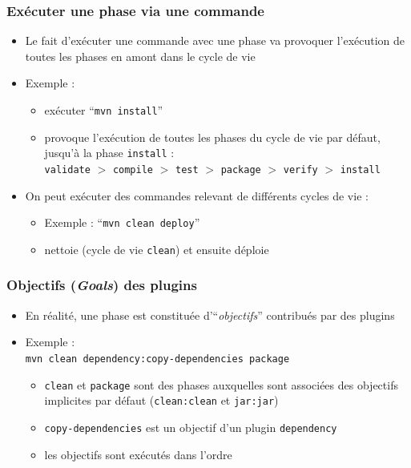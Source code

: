 \documentclass{beamer}
\begin{document}
\begin{frame}[fragile]
  \frametitle{Exécuter une phase via une commande}
\begin{itemize}
\item Le fait d'exécuter une commande avec une phase va provoquer
  l'exécution de toutes les phases en amont dans le cycle de vie
\item Exemple :
  \begin{itemize}
  \item exécuter ``\texttt{mvn install}''
  \item provoque l'exécution de toutes les phases du cycle de vie par
    défaut, jusqu'à la phase \texttt{install} :\\ \texttt{validate} $>$
    \texttt{compile} $>$ \texttt{test} $>$ \texttt{package} $>$ \texttt{verify}
    $>$ \texttt{install}
  \end{itemize}
\item On peut exécuter des commandes relevant de différents cycles de vie :
  \begin{itemize}
  \item Exemple : ``\texttt{mvn clean deploy}''
  \item nettoie (cycle de vie \texttt{clean}) et ensuite déploie
  \end{itemize}
\end{itemize}
\end{frame}

\begin{frame}[fragile]
  \frametitle{Objectifs (\textit{Goals}) des plugins}
\begin{itemize}
\item En réalité, une phase est constituée d'``\textit{objectifs}''
  contribués par des plugins
\item Exemple :\\ \texttt{mvn clean dependency:copy-dependencies package}
  \begin{itemize}
  \item \texttt{clean} et \texttt{package} sont des phases auxquelles
    sont associées des objectifs implicites par défaut
    (\texttt{clean:clean} et \texttt{jar:jar})
  \item \texttt{copy-dependencies} est un objectif d'un plugin
    \texttt{dependency}
  \item les objectifs sont exécutés dans l'ordre
\end{itemize}
\end{itemize}
\end{frame}
\end{document}
